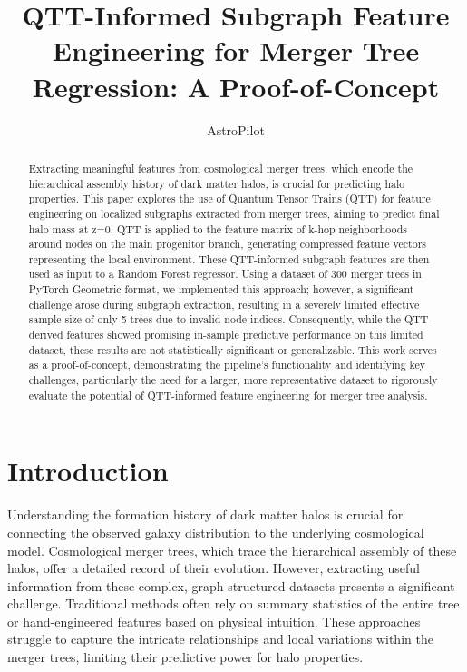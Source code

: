 \documentclass[twocolumn]{aastex631}
\begin{document}
\title{QTT-Informed Subgraph Feature Engineering for Merger Tree Regression: A Proof-of-Concept}

\author{AstroPilot}

\begin{abstract}
Extracting meaningful features from cosmological merger trees, which encode the hierarchical assembly history of dark matter halos, is crucial for predicting halo properties. This paper explores the use of Quantum Tensor Trains (QTT) for feature engineering on localized subgraphs extracted from merger trees, aiming to predict final halo mass at z=0. QTT is applied to the feature matrix of k-hop neighborhoods around nodes on the main progenitor branch, generating compressed feature vectors representing the local environment. These QTT-informed subgraph features are then used as input to a Random Forest regressor. Using a dataset of 300 merger trees in PyTorch Geometric format, we implemented this approach; however, a significant challenge arose during subgraph extraction, resulting in a severely limited effective sample size of only 5 trees due to invalid node indices. Consequently, while the QTT-derived features showed promising in-sample predictive performance on this limited dataset, these results are not statistically significant or generalizable. This work serves as a proof-of-concept, demonstrating the pipeline's functionality and identifying key challenges, particularly the need for a larger, more representative dataset to rigorously evaluate the potential of QTT-informed feature engineering for merger tree analysis.
\end{abstract}



\section{Introduction}
\label{sec:intro}
Understanding the formation history of dark matter halos is crucial for connecting the observed galaxy distribution to the underlying cosmological model. Cosmological merger trees, which trace the hierarchical assembly of these halos, offer a detailed record of their evolution. However, extracting useful information from these complex, graph-structured datasets presents a significant challenge. Traditional methods often rely on summary statistics of the entire tree or hand-engineered features based on physical intuition. These approaches struggle to capture the intricate relationships and local variations within the merger trees, limiting their predictive power for halo properties.
\end{document}
